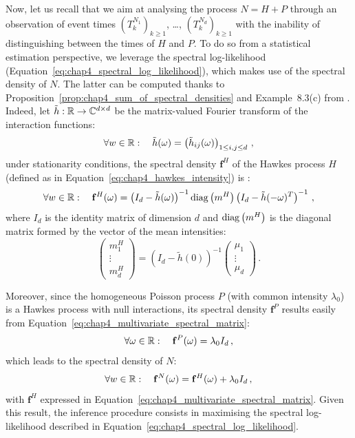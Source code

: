 	      Now, let us recall that we aim at analysing the process $N = H + P$ through an observation of event times $(T_k^{N_1})_{k\geq1}$, \dots, $(T_k^{N_d})_{k\geq1}$ with the inability of distinguishing between the times of $H$ and $P$.
	      To do so from a statistical estimation perspective, we leverage the spectral log-likelihood (Equation~\eqref{eq:chap4_spectral_log_likelihood}), which makes use of the spectral density of $N$.
	      The latter can be computed thanks to Proposition~\ref{prop:chap4_sum_of_spectral_densities} and Example~8.3(c) from \textcite{DaleyV1}.
	      Indeed, let $\tilde h : {\mathbb R} \to \mathbb C^{d \times d}$ be the matrix-valued Fourier transform of the interaction functions:
	      \[
	        \forall w \in {\mathbb R}: \quad
	        \tilde h(\omega) = \left( \tilde h_{ij}(\omega) \right)_{1 \le i, j \le d} \,,
	      \]
	      under stationarity conditions, 
	      the spectral density $\mathbf{f}^H$ of the Hawkes process $H$ (defined as in Equation~\eqref{eq:chap4_hawkes_intensity}) is \parencite[Equation (8.3.11)]{DaleyV1}:
	      \begin{equation}\label{eq:chap4_multivariate_spectral_matrix}
	        \forall w \in {\mathbb R}: \quad
          \mathbf{f}^H(\omega) = \left( I_d - \tilde h(\omega) \right)^{-1} \operatorname{diag} \left(m^H \right) \left(I_d - \tilde h(-\omega)^T \right)^{-1}\,,
        \end{equation}
        where $I_d$ is the identity matrix of dimension $d$ and $\operatorname{diag} \left(m^H \right)$ is the diagonal matrix formed by the vector of the mean intensities:
        \[
          \begin{pmatrix}
            m_1^H\\
            \vdots\\
            m_d^H
          \end{pmatrix}
          = \left( I_d - \tilde h(0) \right)^{-1} 
          \begin{pmatrix}
            \mu_1\\
            \vdots\\
            \mu_d
          \end{pmatrix}\,.
        \]
        
        Moreover, since the homogeneous Poisson process $P$ (with common intensity \(\lambda_0\)) is a Hawkes process with null interactions,
        its spectral density \(\mathbf f^P\) results easily from Equation~\eqref{eq:chap4_multivariate_spectral_matrix}:
        \[
          \forall \omega \in {\mathbb R}: \quad
          \mathbf{f}^P(\omega) = \lambda_0 I_d \,,
        \]
        which leads to the spectral density of $N$:        
        \begin{equation}\label{eq:chap4_noisy_spectral_matrix}
          \forall w \in {\mathbb R}: \quad
          \mathbf{f}^N(\omega)
          = \mathbf{f}^H(\omega) + \lambda_0 I_d \, ,
        \end{equation}
        with $\mathbf{f}^H$ expressed in Equation~\eqref{eq:chap4_multivariate_spectral_matrix}.
        Given this result, the inference procedure consists in maximising the spectral log-likelihood described in Equation~\eqref{eq:chap4_spectral_log_likelihood}.
        
